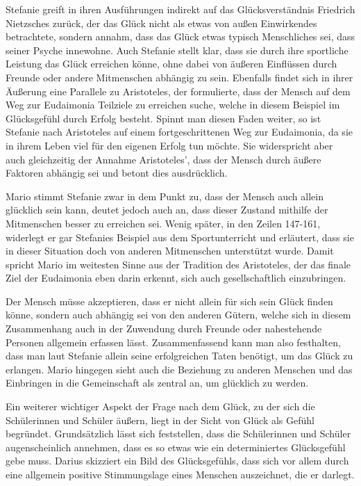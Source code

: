 Stefanie greift in ihren Ausführungen indirekt auf das Glücksverständnis Friedrich Nietzsches zurück, der das Glück nicht als etwas von außen Einwirkendes betrachtete, sondern annahm, dass das Glück etwas typisch Menschliches sei, dass seiner Psyche innewohne. 
Auch Stefanie stellt klar, dass sie durch ihre sportliche Leistung das Glück erreichen könne, ohne dabei von äußeren Einflüssen durch Freunde oder andere Mitmenschen abhängig zu sein. 
Ebenfalls findet sich in ihrer Äußerung eine Parallele zu Aristoteles, der formulierte, dass der Mensch auf dem Weg zur Eudaimonia Teilziele zu erreichen suche, welche in diesem Beispiel im Glücksgefühl durch Erfolg besteht. 
Spinnt man diesen Faden weiter, so ist Stefanie nach Aristoteles auf einem fortgeschrittenen Weg zur Eudaimonia, da sie in ihrem Leben viel für den eigenen Erfolg tun möchte. 
Sie widerspricht aber auch gleichzeitig der Annahme Aristoteles', dass der Mensch durch äußere Faktoren abhängig sei und betont dies ausdrücklich.

Mario stimmt Stefanie zwar in dem Punkt zu, dass der Mensch auch allein glücklich sein kann, deutet jedoch auch an, dass dieser Zustand mithilfe der Mitmenschen besser zu erreichen sei. 
Wenig später, in den Zeilen 147-161, widerlegt er gar Stefanies Beispiel aus dem Sportunterricht und erläutert, dass sie in dieser Situation doch von anderen Mitmenschen unterstützt wurde. 
Damit spricht Mario im weitesten Sinne aus der Tradition des Aristoteles, der das finale Ziel der Eudaimonia eben darin erkennt, sich auch gesellschaftlich einzubringen. 

Der Mensch müsse akzeptieren, dass er nicht allein für sich sein Glück finden könne, sondern auch abhängig sei von den anderen Gütern, welche sich in diesem Zusammenhang auch in der Zuwendung durch Freunde oder nahestehende Personen allgemein erfassen lässt. 
Zusammenfassend kann man also festhalten, dass man laut Stefanie allein seine erfolgreichen Taten benötigt, um das Glück zu erlangen. 
Mario hingegen sieht auch die Beziehung zu anderen Menschen und das Einbringen in die Gemeinschaft als zentral an, um glücklich zu werden.

Ein weiterer wichtiger Aspekt der Frage nach dem Glück, zu der sich die Schülerinnen und Schüler äußern, liegt in der Sicht von Glück als Gefühl begründet. 
Grundsätzlich lässt sich feststellen, dass die Schülerinnen und Schüler augenscheinlich annehmen, dass es so etwas wie ein determiniertes Glücksgefühl gebe muss.
Darius skizziert ein Bild des Glücksgefühls, dass sich vor allem durch eine allgemein positive Stimmungslage eines Menschen auszeichnet, die er darlegt.

